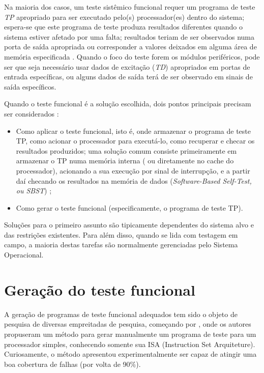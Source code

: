 		Na maioria dos casos, um teste sistêmico funcional requer um programa de teste \textit{TP} apropriado para ser executado pelo(s) processador(es) dentro do sistema; espera-se que este programa de teste produza resultados diferentes quando o sistema estiver afetado por uma falta; resultados teriam de ser observados numa porta de saída apropriada ou corresponder a valores deixados em alguma área de memória especificada \citep{jutman2014high}. Quando o foco do teste forem os módulos periféricos, pode ser que seja necessário usar dados de excitação (\textit{TD}) apropriados em portas de entrada específicas, ou alguns dados de saída terá de ser observado em sinais de saída específicos.
		
		Quando o teste funcional é a solução escolhida, dois pontos principais precisam ser considerados \citep{jutman2014high}:
		\begin{itemize}
			\item Como aplicar o teste funcional, isto é, onde armazenar o programa de teste TP, como acionar o processador para executá-lo, como recuperar e checar os resultados produzidos; uma solução comum consiste primeiramente em armazenar o TP numa memória interna ( ou diretamente no cache do processador), acionando a sua execução por sinal de interrupção, e a partir daí checando os resultados na memória de dados (\textit{Software-Based Self-Test, ou SBST}) \citep{psarakis2010microprocessor};
			\item Como gerar o teste funcional (especificamente, o programa de teste TP).
		\end{itemize}
		Soluções para o primeiro assunto são tipicamente dependentes do sistema alvo e das restrições existentes. Para além disso, quando se lida com testagem em campo, a maioria destas tarefas são normalmente gerenciadas pelo Sistema Operacional.
		
		\section{Geração do teste funcional}
			A geração de programas de teste funcional adequados tem sido o objeto de pesquisa de diversas empreitadas de pesquisa, começando por \citet{thatte1980test}, onde os autores propuseram um método para gerar manualmente um programa de teste para um processador simples, conhecendo somente sua ISA (Instruction Set Arquiteture). Curiosamente, o método apresentou experimentalmente ser capaz de atingir uma boa cobertura de falhas (por volta de 90\%).
			
